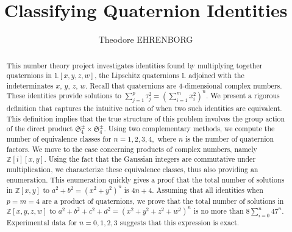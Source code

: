 \documentclass[12pt,table]{article}
\theoremstyle{definition}
\theoremstyle{remark}
\newcommand{\Zzz}{\mathbb Z}
\newcommand{\Lll}{\mathbb L}
\newcommand{\fix}[1]{\todo[inline]{#1}}
\numberwithin{equation}{section}
\begin{document}


\title{Classifying Quaternion Identities}





\author{\sc Theodore EHRENBORG
\fix{I should thank Professor Leep.}
}



\date{}

\maketitle



\begin{abstract}
This number theory project investigates identities found by
multiplying together quaternions in $ \Lll[x,y,z,w] $, the
Lipschitz quaternions $ \Lll $ adjoined with the
indeterminates $x$, $y$, $z$, $w$.  Recall that quaternions
are $4$-dimensional complex numbers.  These identities provide
solutions to $ \sum_{j = 1}^{p} \tau_j ^ 2 = \left( \sum_{i = 1}^{m}
x_i ^ 2 \right) ^ n $. We present a rigorous definition that captures
the intuitive notion of when two such identities are equivalent. This
definition implies that the true structure of this problem involves the
group action of the direct product $ \mathfrak{S}_4^\pm \times \mathfrak{S}_4^\pm $.  Using
two complementary methods, we compute the number of equivalence
classes for $n = 1, 2, 3, 4,$ where $n$ is the number of
quaternion factors. We move to the case concerning products of complex
numbers, namely $ \Zzz[i][x,y] $. Using the fact that the
Gaussian integers are commutative under multiplication, we
characterize these equivalence classes, thus also providing an
enumeration.
This enumeration quickly gives a proof that
the total number of solutions in $\Zzz[x,y] $
to $a^2 + b^2 = (x^2 + y^2)^n$
is $4n + 4$.
Assuming that all identities when $p = m = 4$
are a product of quaternions, we prove
that
the total number of solutions in $\Zzz[x,y,z,w] $
to $a^2 + b^2 + c^2 + d^2 = (x^2 + y^2 + z^2 + w^2)^n$
is no more than
$ 8 \sum_{i = 0}^n{47^n} $.
Experimental data for $n = 0,1,2,3$
suggests that this expression
is exact.

\end{abstract}
\end{document}
